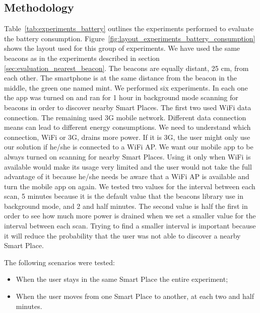 \subsection{Methodology}
\label{sub:evaluation_energy_consumption_methodology}
Table~\ref{tab:experiments_battery} outlines the experiments performed to evaluate the battery consumption.
Figure~\ref{fig:layout_experiments_battery_consumption} shows the layout used for this group of experiments.
We have used the same beacons as in the experiments described in section \ref{sec:evaluation_nearest_beacon}.
The beacons are equally distant, 25 cm, from each other.
The smartphone is at the same distance from the beacon in the middle, the green one named mint.
We performed six experiments.
In each one the app was turned on and ran for 1 hour in background mode scanning for beacons in order to discover nearby Smart Places.
The first two used \gls{WiFi} data connection.
The remaining used \gls{3G} mobile network.
Different data connection means can lead to different energy consumptions.
We need to understand which connection, \gls{WiFi} or \gls{3G}, drains more power.
If it is \gls{3G}, the user might only use our solution if he/she is connected to a \gls{WiFi} \gls{AP}.
We want our mobile app to be always turned on scanning for nearby Smart Places.
Using it only when \gls{WiFi} is available would make its usage very limited and the user would not take the full advantage of it because he/she needs be aware that a \gls{WiFi} \gls{AP} is available and turn the mobile app on again.
We tested two values for the interval between each scan, 5 minutes because it is the default value that the beacons library use in background mode, and 2 and half minutes.
The second value is half the first in order to see how much more power is drained when we set a smaller value for the interval between each scan.
Trying to find a smaller interval is important because it will reduce the probability that the user was not able to discover a nearby Smart Place.

The following scenarios were tested:
\begin{itemize}
  \item
  When the user stays in the same Smart Place the entire experiment;
  \item
  When the user moves from one Smart Place to another, at each two and half minutes.
\end{itemize}


